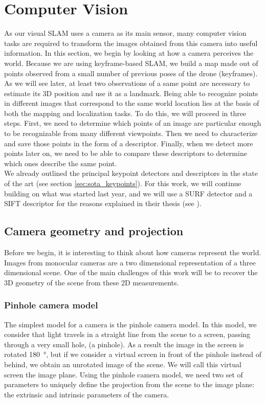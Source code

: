 \chapter{Computer Vision} %
As our visual SLAM uses a camera as its main sensor, many computer vision tasks are required to transform the images obtained from this camera into useful information. In this section, we begin by looking at how a camera perceives the world. Because we are using keyframe-based SLAM, we build a map made out of points observed from a small number of previous poses of the drone (keyframes). As we will see later, at least two observations of a same point are necessary to estimate its 3D position and use it as a landmark. Being able to recognize points in different images that correspond to the same world location lies at the basis of both the mapping and localization tasks. To do this, we will proceed in three steps. First, we need to determine which points of an image are particular enough to be recognizable from many different viewpoints. Then we need to characterize and save those points in the form of a descriptor. Finally, when we detect more points later on, we need to be able to compare these descriptors to determine which ones describe the same point.\\

We already outlined the principal keypoint detectors and descriptors in the state of the art (see section \ref{sec:sota_keypoints}). For this work, we will continue building on what was started last year, and we will use a SURF detector and a SIFT descriptor for the reasons explained in their thesis (see  \cite{jacquesleclere}).

\section{Camera geometry and projection}
Before we begin, it is interesting to think about how cameras represent the world. Images from monocular cameras are a two dimensional representation of a three dimensional scene. One of the main challenges of this work will be to recover the 3D geometry of the scene from these 2D measurements.

\subsection{Pinhole camera model}
The simplest model for a camera is the pinhole camera model. In this model, we consider that light travels in a straight line from the scene to a screen, passing through a very small hole, (a pinhole). As a result the image in the screen is rotated \SI{180}{\degree}, but if we consider a virtual screen in front of the pinhole instead of behind, we obtain an unrotated image of the scene. We will call this virtual screen the image plane. Using the pinhole camera model, we need two set of parameters to uniquely define the projection from the scene to the image plane: the extrinsic and intrinsic parameters of the camera.


